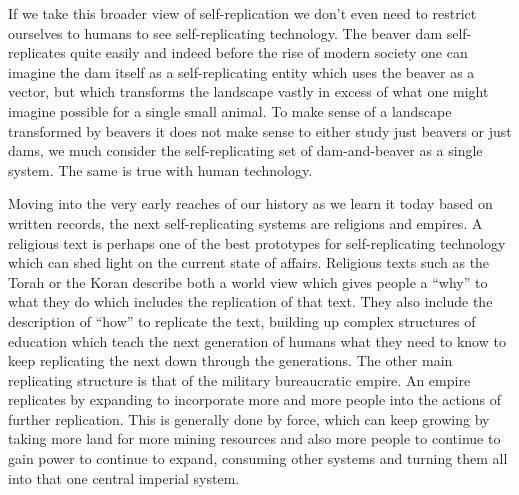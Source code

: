\documentclass[12pt,a4paper]{amsart}
\numberwithin{equation}{section}
\begin{document}
If we take this broader view of self-replication we don't even need to
restrict ourselves to humans to see self-replicating technology. The
beaver dam self-replicates quite easily and indeed before the rise of
modern society one can imagine the dam itself as a self-replicating
entity which uses the beaver as a vector, but which transforms the
landscape vastly in excess of what one might imagine possible for a
single small animal. To make sense of a landscape transformed by beavers
it does not make sense to either study just beavers or just dams, we
much consider the self-replicating set of dam-and-beaver as a single
system. The same is true with human technology.

Moving into the very early reaches of our history as we learn it today
based on written records, the next self-replicating systems are
religions and empires. A religious text is perhaps one of the best
prototypes for self-replicating technology which can shed light on the
current state of affairs. Religious texts such as the Torah or the Koran
describe both a world view which gives people a ``why'' to what they do
which includes the replication of that text. They also include the
description of ``how'' to replicate the text, building up complex
structures of education which teach the next generation of humans what
they need to know to keep replicating the next down through the
generations. The other main replicating structure is that of the
military bureaucratic empire. An empire replicates by expanding to
incorporate more and more people into the actions of further
replication. This is generally done by force, which can keep growing by
taking more land for more mining resources and also more people to
continue to gain power to continue to expand, consuming other systems
and turning them all into that one central imperial system.
\end{document}
